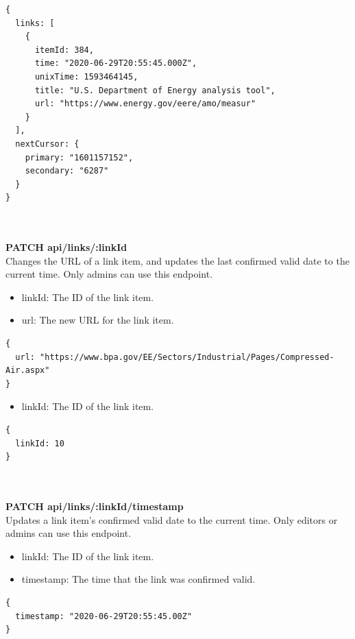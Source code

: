 \documentclass[onecolumn, draftclsnofoot,10pt, compsoc, usenames, dvipsnames]{IEEEtran}
\begin{document}
\begin{lstlisting}[caption=Example Response]
{ 
  links: [
    {
      itemId: 384,
      time: "2020-06-29T20:55:45.000Z",
      unixTime: 1593464145,
      title: "U.S. Department of Energy analysis tool",
      url: "https://www.energy.gov/eere/amo/measur"
    }
  ],
  nextCursor: {
    primary: "1601157152",
    secondary: "6287"
  }
}
\end{lstlisting}
\\~\\


\noindent
\textbf{\textcolor{BlueGreen}{PATCH} api/links/:linkId} \\
Changes the URL of a link item, and updates the last confirmed valid date to the current time. Only admins can use this endpoint.
\begin{itemize}
    \item linkId: The ID of the link item.
    \item url: The new URL for the link item.
\end{itemize}
\begin{lstlisting}[caption=Example Request Body]
{
  url: "https://www.bpa.gov/EE/Sectors/Industrial/Pages/Compressed-Air.aspx"
}
\end{lstlisting}
\begin{itemize}
  \item linkId: The ID of the link item.
\end{itemize}
\begin{lstlisting}[caption=Example Response]
{ 
  linkId: 10
}
\end{lstlisting}
\\~\\


\noindent
\textbf{\textcolor{BlueGreen}{PATCH} api/links/:linkId/timestamp} \\
Updates a link item's confirmed valid date to the current time. Only editors or admins can use this endpoint.
\begin{itemize}
  \item linkId: The ID of the link item.
  \item timestamp: The time that the link was confirmed valid.
\end{itemize}
\begin{lstlisting}[caption=Example Response]
{ 
  timestamp: "2020-06-29T20:55:45.00Z"
}
\end{lstlisting}
\\~\\
\end{document}

